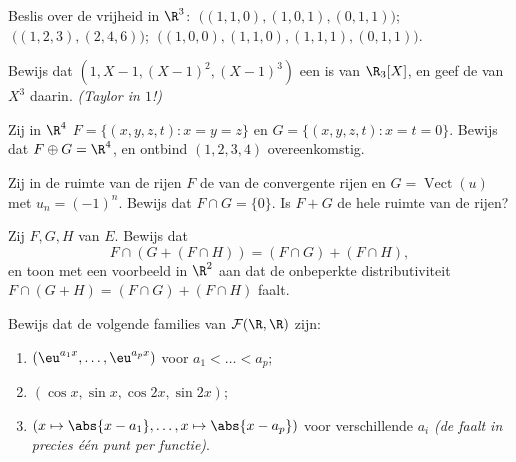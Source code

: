 \begin{exercise}[$\star$]\label{exo:b1:vspaces:3}
Beslis over de vrijheid in $\R^3$: $\;\bigl((1,1,0), (1,0,1),
(0,1,1)\bigr)$; $\;\bigl((1,2,3), (2,4,6)\bigr)$;
$\;\bigl((1,0,0), (1,1,0), (1,1,1), (0,1,1)\bigr)$.
\end{exercise}

\begin{exercise}[$\star$]\label{exo:b1:vspaces:4}
Bewijs dat $(1, X - 1, (X-1)^2, (X-1)^3)$ een  is van
$\R_3[X]$, en geef de  van $X^3$ daarin. \emph{(Taylor
in $1$!)}
\end{exercise}

\begin{exercise}[$\star\star$]\label{exo:b1:vspaces:5}
Zij in $\R^4$ $F = \{(x,y,z,t) : x = y = z\}$ en $G = \{(x,y,z,t) :
x = t = 0\}$. Bewijs dat $F \oplus G = \R^4$, en ontbind $(1,2,3,4)$
overeenkomstig.
\end{exercise}

\begin{exercise}[$\star\star$]\label{exo:b1:vspaces:6}
Zij in de ruimte van de rijen $F$ de  van de convergente
rijen en $G = \operatorname{Vect}(u)$ met $u_n = (-1)^n$. Bewijs dat
$F \cap G = \{0\}$. Is $F + G$ de hele ruimte van de rijen?
\end{exercise}

\begin{exercise}[$\star\star$]\label{exo:b1:vspaces:7}
Zij $F, G, H$  van $E$. Bewijs dat
\[
F \cap (G + (F \cap H)) = (F \cap G) + (F \cap H),
\]
en toon met een voorbeeld in $\R^2$ aan dat de onbeperkte
distributiviteit $F \cap (G + H) = (F\cap G) + (F \cap H)$ faalt.
\end{exercise}

\begin{exercise}[$\star\star\star$]\label{exo:b1:vspaces:8}
Bewijs dat de volgende families van $\mathcal{F}(\R, \R)$  zijn:
\begin{enumerate}
  \item $(\eu^{a_1 x}, \dots, \eu^{a_p x})$ voor $a_1 < \dots <
        a_p$;
  \item $(\cos x, \sin x, \cos 2x, \sin 2x)$;
  \item $(x \mapsto \abs{x - a_1}, \dots, x \mapsto \abs{x - a_p})$
        voor verschillende $a_i$ \emph{(de  faalt in
        precies één punt per functie)}.
\end{enumerate}
\end{exercise}

